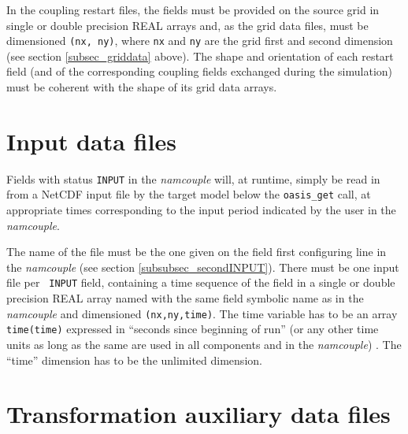 In the coupling restart files, the fields must be provided on the
source grid in single or double precision REAL arrays and, as the grid
data files, must be dimensioned {\tt (nx, ny)}, where {\tt nx} and
{\tt ny} are the grid first and second dimension (see section
\ref{subsec_griddata} above).  The shape and orientation of each
restart field (and of the corresponding coupling fields exchanged
during the simulation) must be coherent with the shape of its grid
data arrays.

\section{Input data files}
\label{subsec_inputdata}

Fields with status {\tt INPUT} in the {\it namcouple} will, at
runtime, simply be read in from a NetCDF input file by the target
model below the {\tt oasis\_get} call, at appropriate times
corresponding to the input period indicated by the user in the {\it
  namcouple}.

The name of the file must be the one given on the field first
configuring line in the {\it namcouple} (see section
\ref{subsubsec_secondINPUT}). There must be one input file per {\tt
  INPUT} field, containing a time sequence of the field in a single or
double precision REAL array named with the same field symbolic name as in the
{\it namcouple} and dimensioned {\tt (nx,ny,time)}.  The time variable
has to be an array {\tt time(time)} expressed in ``seconds since
beginning of run'' (or any other time
    units as long as the same are used in all components and in the {\it
      namcouple}) . The ``time'' dimension has to be the unlimited
dimension.


\section{Transformation auxiliary data files}
\label{subsec_mapdata}

